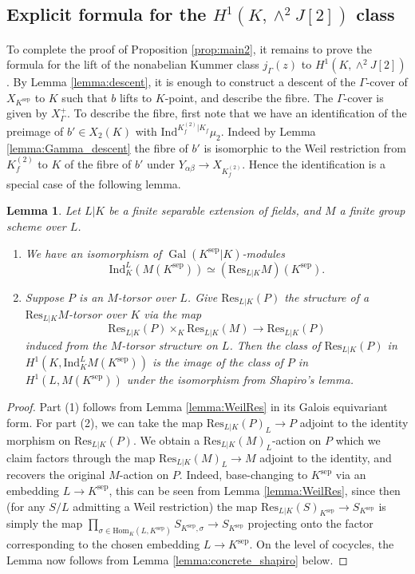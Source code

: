 \documentclass[11pt]{amsart}
\theoremstyle{plain}
\newtheorem{lemma}{Lemma}
\theoremstyle{definition}
\DeclareMathOperator{\Gal}{Gal}
\newcommand{\Ind}{\mathrm{Ind}}
\newcommand{\sep}{\mathrm{sep}}
\newcommand{\Res}{\mathrm{Res}}
\newcommand{\Hom}{\mathrm{Hom}}
\begin{document}
\subsection{Explicit formula for the $H^1 (K,\wedge ^2 J[2])$ class}
To complete the proof of Proposition \ref{prop:main2}, it remains to prove the formula for the lift of the nonabelian Kummer class $j_{\Gamma }(z)$ to $H^1 (K,\wedge ^2 J[2])$. By Lemma \ref{lemma:descent}, it is enough to construct a descent of the $\Gamma $-cover of $X_{K^{\sep }}$ to $K$ such that $b$ lifts to $K$-point, and describe the fibre.  The $\Gamma $-cover is given by $X_{\Gamma }^+$. To describe the fibre, first note that we have an identification of the preimage of $b' \in X_2 (K)$ with $\Ind ^{K_f ^{(2)}|K_f }\mu _2 $. Indeed by Lemma \ref{lemma:Gamma_descent} the fibre of $b'$ is isomorphic to the Weil restriction from $K_f ^{(2)}$ to $K$ of the fibre of $b'$ under $Y_{\alpha \beta }\to X_{K_f ^{(2)}}$. Hence the identification is a special case of the following lemma.

\begin{lemma}\label{lemma:shapiro_weil_restriction}
Let $L|K$ be a finite separable extension of fields, and $M$ a finite group scheme over $L$. 
\begin{enumerate}
\item 
We have an isomorphism of $\Gal (K^{\sep }|K)$-modules
\[
\Ind ^L _K (M(K^{\sep }))\simeq (\Res _{L|K}M)(K^{\sep }).
\]
\item
Suppose $P$ is an $M$-torsor over $L$. Give $\Res _{L|K}(P)$ the structure of a $\Res _{L|K}M$-torsor over $K$ via the map
\[
\Res _{L|K}(P) \times _K \Res _{L|K}(M)\to \Res _{L|K}(P)
\]
induced from the $M$-torsor structure on $L$. Then the class of $\Res _{L|K}(P)$ in $H^1 (K,\Ind ^L _K M(K^{\sep }))$ is the image of the class of $P$ in $H^1 (L,M(K^{\sep }))$ under the isomorphism from Shapiro's lemma.
\end{enumerate}
\end{lemma}
\begin{proof}
Part (1) follows from Lemma \ref{lemma:WeilRes} in its Galois equivariant form. For part (2), we can take the map $\Res _{L|K}(P)_L \to P$ adjoint to the identity morphism on $\Res _{L|K}(P)$. We obtain a $\Res _{L|K}(M)_L$-action on $P$ which we claim factors through the map $\Res _{L|K}(M)_L \to M$ adjoint to the identity, and recovers the original $M$-action on $P$. Indeed, base-changing to $K^{\sep }$ via an embedding $L\to K^{\sep }$, this can be seen from Lemma \ref{lemma:WeilRes}, since then (for any $S/L$ admitting a Weil restriction) the map $\Res _{L|K}(S)_{K^{\sep }}\to S_{K^{\sep }}$ is simply the map $\prod _{\sigma \in \Hom _K (L,K^{\sep })}S_{K^{\sep },\sigma }\to S_{K^{\sep }}$ projecting onto the factor corresponding to the chosen embedding $L\to K^{\sep }$. On the level of cocycles, the Lemma now follows from Lemma \ref{lemma:concrete_shapiro} below.
 \end{proof}
\end{document}
